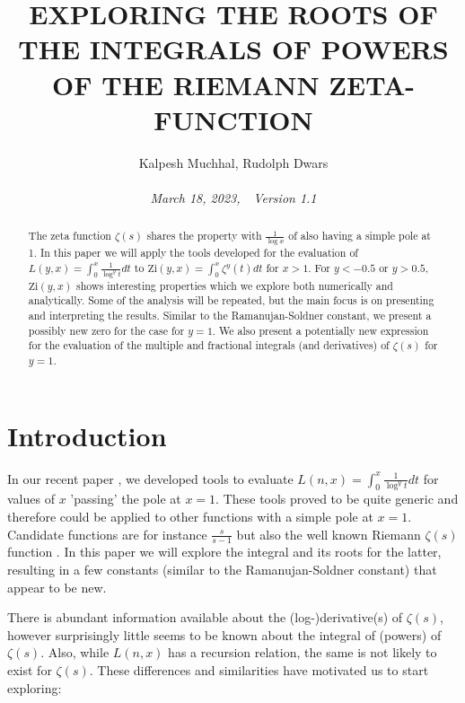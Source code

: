 \documentclass[a4paper,11pt,twoside]{amsart}
\newcommand\Zi{\mathrm{Zi}}
\begin{document}
\title[Roots of integrals of powers of the Riemann Zeta-function]{EXPLORING THE ROOTS OF THE INTEGRALS OF POWERS OF THE RIEMANN ZETA-FUNCTION}

\author{Kalpesh Muchhal, Rudolph Dwars \\ \\ \textit{March 18, 2023,  \,\, Version 1.1}}
\address{\tt{{\it E-mail Address}: ra.dwars@quicknet.nl}}
\address{\tt{{\it E-mail Address}: kalpesh.muchhal@iitbombay.org}}


\begin{abstract}
The zeta function $\zeta(s)$ shares the property with $\frac{1}{\log x}$ of also having a simple pole at 1. In this paper we will apply the tools developed for the evaluation of $L(y,x) = \int_0^x \frac{1}{\log^{y} t} dt$ to $\Zi(y,x)=\int_0^x \zeta^{y}(t) dt$ for $x>1$. For $y < -0.5$ or $y > 0.5$, $\Zi(y,x)$ shows interesting properties which we explore both numerically and analytically. Some of the analysis will be repeated, but the main focus is on presenting and interpreting the results. Similar to the Ramanujan-Soldner constant, we present a possibly new zero for the case for $y=1$. We also present a potentially new expression for the evaluation of the multiple and fractional integrals (and derivatives) of $\zeta(s)$ for $y=1$. 
\end{abstract}

\maketitle

\section{Introduction}

In our recent paper \cite{mudw}, we developed tools to evaluate $L(n,x) = \int_0^x \frac{1}{\log^{y} t} dt$ for values of $x$ 'passing' the pole at $x=1$. These tools proved to be quite generic and therefore could be applied to other functions with a simple pole at $x=1$. Candidate functions are for instance $\frac{s}{s-1}$ but also the well known Riemann $\zeta(s)$ function \cite{edwr}. In this paper we will explore the integral and its roots for the latter, resulting in a few constants (similar to the Ramanujan-Soldner constant) that appear to be new.

There is abundant information available about the (log-)derivative(s) of $\zeta(s)$, however surprisingly little seems to be known about the integral of (powers) of $\zeta(s)$. Also, while $L(n,x)$ has a recursion relation, the same is not likely to exist for $\zeta(s)$. These differences and similarities have motivated us to start exploring:
\end{document}
